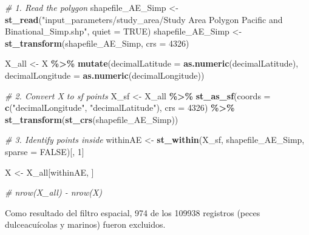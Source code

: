 \documentclass[sn-apa,pdflatex]{sn-jnl}
\newenvironment{Shaded}{\begin{snugshade}}{\end{snugshade}}
\newcommand{\AttributeTok}[1]{\textcolor[rgb]{0.13,0.29,0.53}{#1}}
\newcommand{\CommentTok}[1]{\textcolor[rgb]{0.56,0.35,0.01}{\textit{#1}}}
\newcommand{\ConstantTok}[1]{\textcolor[rgb]{0.56,0.35,0.01}{#1}}
\newcommand{\DecValTok}[1]{\textcolor[rgb]{0.00,0.00,0.81}{#1}}
\newcommand{\FunctionTok}[1]{\textcolor[rgb]{0.13,0.29,0.53}{\textbf{#1}}}
\newcommand{\NormalTok}[1]{#1}
\newcommand{\OtherTok}[1]{\textcolor[rgb]{0.56,0.35,0.01}{#1}}
\newcommand{\SpecialCharTok}[1]{\textcolor[rgb]{0.81,0.36,0.00}{\textbf{#1}}}
\newcommand{\StringTok}[1]{\textcolor[rgb]{0.31,0.60,0.02}{#1}}
\begin{document}
\begin{Shaded}
\begin{Highlighting}[]
\CommentTok{\# 1. Read the polygon}
\NormalTok{shapefile\_AE\_Simp }\OtherTok{\textless{}{-}} \FunctionTok{st\_read}\NormalTok{(}\StringTok{"input\_parameters/study\_area/Study Area Polygon Pacific and Binational\_Simp.shp"}\NormalTok{,}
    \AttributeTok{quiet =} \ConstantTok{TRUE}\NormalTok{)}
\NormalTok{shapefile\_AE\_Simp }\OtherTok{\textless{}{-}} \FunctionTok{st\_transform}\NormalTok{(shapefile\_AE\_Simp, }\AttributeTok{crs =} \DecValTok{4326}\NormalTok{)}

\NormalTok{X\_all }\OtherTok{\textless{}{-}}\NormalTok{ X }\SpecialCharTok{\%\textgreater{}\%}
    \FunctionTok{mutate}\NormalTok{(}\AttributeTok{decimalLatitude =} \FunctionTok{as.numeric}\NormalTok{(decimalLatitude), }\AttributeTok{decimalLongitude =} \FunctionTok{as.numeric}\NormalTok{(decimalLongitude))}

\CommentTok{\# 2. Convert X to sf points}
\NormalTok{X\_sf }\OtherTok{\textless{}{-}}\NormalTok{ X\_all }\SpecialCharTok{\%\textgreater{}\%}
    \FunctionTok{st\_as\_sf}\NormalTok{(}\AttributeTok{coords =} \FunctionTok{c}\NormalTok{(}\StringTok{"decimalLongitude"}\NormalTok{, }\StringTok{"decimalLatitude"}\NormalTok{),}
        \AttributeTok{crs =} \DecValTok{4326}\NormalTok{) }\SpecialCharTok{\%\textgreater{}\%}
    \FunctionTok{st\_transform}\NormalTok{(}\FunctionTok{st\_crs}\NormalTok{(shapefile\_AE\_Simp))}

\CommentTok{\# 3. Identify points inside}
\NormalTok{withinAE }\OtherTok{\textless{}{-}} \FunctionTok{st\_within}\NormalTok{(X\_sf, shapefile\_AE\_Simp, }\AttributeTok{sparse =} \ConstantTok{FALSE}\NormalTok{)[,}
    \DecValTok{1}\NormalTok{]}

\NormalTok{X }\OtherTok{\textless{}{-}}\NormalTok{ X\_all[withinAE, ]}

\CommentTok{\# nrow(X\_all) {-} nrow(X)}
\end{Highlighting}
\end{Shaded}

Como resultado del filtro espacial, 974 de los 109938 registros (peces
dulceacuícolas y marinos) fueron excluidos.
\end{document}
